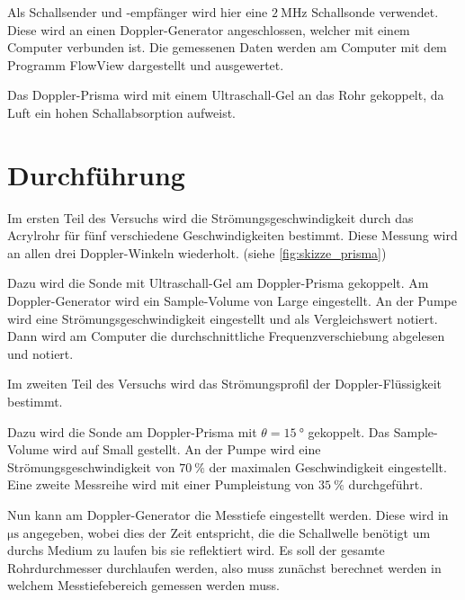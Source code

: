 Als Schallsender und -empfänger wird hier eine $\SI{2}{\mega\hertz}$ Schallsonde verwendet.
Diese wird an einen Doppler-Generator angeschlossen, welcher mit einem Computer verbunden ist.
Die gemessenen Daten werden am Computer mit dem Programm FlowView dargestellt und ausgewertet.

Das Doppler-Prisma wird mit einem Ultraschall-Gel an das Rohr gekoppelt, da Luft ein hohen Schallabsorption aufweist.


\section{Durchführung}
\label{sec:Durchführung}

Im ersten Teil des Versuchs wird die Strömungsgeschwindigkeit durch das Acrylrohr für fünf verschiedene Geschwindigkeiten bestimmt. 
Diese Messung wird an allen drei Doppler-Winkeln wiederholt. (siehe \autoref{fig:skizze_prisma})

Dazu wird die Sonde mit Ultraschall-Gel am Doppler-Prisma gekoppelt.
Am Doppler-Generator wird ein Sample-Volume von Large eingestellt.
An der Pumpe wird eine Strömungsgeschwindigkeit eingestellt und als Vergleichswert notiert.
Dann wird am Computer die durchschnittliche Frequenzverschiebung abgelesen und notiert.

Im zweiten Teil des Versuchs wird das Strömungsprofil der Doppler-Flüssigkeit bestimmt.

Dazu wird die Sonde am Doppler-Prisma mit $\theta=\SI{15}{\degree}$ gekoppelt.
Das Sample-Volume wird auf Small gestellt.
An der Pumpe wird eine Strömungsgeschwindigkeit von $\SI{70}{\percent}$ der maximalen Geschwindigkeit eingestellt.
Eine zweite Messreihe wird mit einer Pumpleistung von $\SI{35}{\percent}$ durchgeführt.

Nun kann am Doppler-Generator die Messtiefe eingestellt werden.
Diese wird in $\si{\micro\second}$ angegeben, wobei dies der Zeit entspricht, die die Schallwelle benötigt um durchs Medium zu laufen bis sie reflektiert wird.
Es soll der gesamte Rohrdurchmesser durchlaufen werden, also muss zunächst berechnet werden in welchem Messtiefebereich gemessen werden muss.

